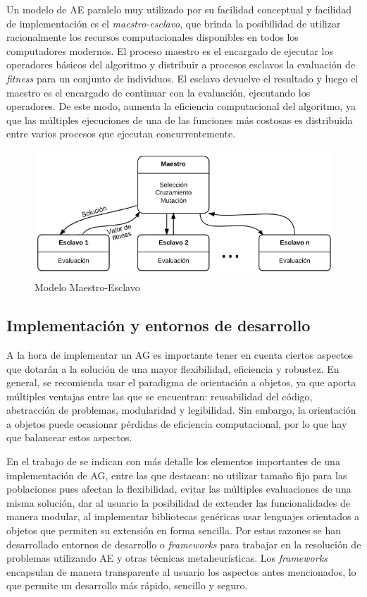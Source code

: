 Un modelo de AE paralelo muy utilizado por su facilidad conceptual y facilidad de implementación es el \emph{maestro-esclavo}, que brinda la posibilidad de utilizar racionalmente los recursos computacionales disponibles en todos los computadores modernos. El proceso maestro es el encargado de ejecutar los operadores básicos del algoritmo y distribuir a procesos esclavos la evaluación de \emph{fitness} para un conjunto de individuos. El esclavo devuelve el resultado y luego el maestro es el encargado de continuar con la evaluación, ejecutando los operadores. De este modo, aumenta la eficiencia computacional del algoritmo, ya que las múltiples ejecuciones de una de las funciones más costosas es distribuida entre varios procesos que ejecutan concurrentemente.

\begin{figure}[ht]
	\centering
	\includegraphics[width=0.9\linewidth]{Figures/diagrama-master-slave}
	\caption[Modelo Maestro-Esclavo]{Modelo Maestro-Esclavo}
	\label{fig:diagrama-master-slave}
\end{figure}

\subsection{Implementación y entornos de desarrollo}

A la hora de implementar un AG es importante tener en cuenta ciertos aspectos que dotarán a la solución de una mayor flexibilidad, eficiencia y robustez. En general, se recomienda usar el paradigma de orientación a objetos, ya que aporta múltiples ventajas entre las que se encuentran: reusabilidad del código, abstracción de problemas, modularidad y legibilidad. Sin embargo, la orientación a objetos puede ocasionar pérdidas de eficiencia computacional, por lo que hay que balancear estos aspectos.

En el trabajo de \citet{Alba1997} se indican con más detalle los elementos importantes de una implementación de AG, entre las que destacan: no utilizar tamaño fijo para las poblaciones pues afectan la flexibilidad, evitar las múltiples evaluaciones de una misma solución, dar al usuario la posibilidad de extender las funcionalidades de manera modular, al implementar bibliotecas genéricas usar lenguajes orientados a objetos que permiten su extensión en forma sencilla. Por estas razones se han desarrollado entornos de desarrollo o \emph{frameworks} para trabajar en la resolución de problemas utilizando AE y otras técnicas metaheurísticas. Los \emph{frameworks} encapsulan de manera transparente al usuario los aspectos antes mencionados, lo que permite un desarrollo más rápido, sencillo y seguro.

